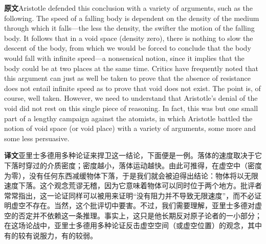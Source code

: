 \documentclass[UTF8,zihao=-4]{ctexart}
\newcommand{\BodyFont}{\fontsize{10.5pt}{15.5pt}\selectfont}
\newcommand{\origlabel}{\textbf{原文}\quad}
\newcommand{\translabel}{\textbf{译文}\quad}
\newcommand{\orig}{\par\noindent\begingroup\BodyFont\origlabel}
\newcommand{\zhline}[1]{\par\endgroup\noindent\begingroup\BodyFont\translabel #1\par\endgroup\vspace{0.35em}}
\begin{document}
\orig Aristotle defended this conclusion with a variety of arguments, such as the following. The speed of a falling body is dependent on the density of the medium through which it falls---the less the density, the swifter the motion of the falling body. It follows that in a void space (density zero), there is nothing to slow the descent of the body, from which we would be forced to conclude that the body would fall with infinite speed---a nonsensical notion, since it implies that the body could be at two places at the same time. Critics have frequently noted that this argument can just as well be taken to prove that the absence of resistance does not entail infinite speed as to prove that void does not exist. The point is, of course, well taken. However, we need to understand that Aristotle's denial of the void did not rest on this single piece of reasoning. In fact, this was but one small part of a lengthy campaign against the atomists, in which Aristotle battled the notion of void space (or void place) with a variety of arguments, some more and some less persuasive.

\zhline{亚里士多德用多种论证来捍卫这一结论，下面便是一例。落体的速度取决于它下落时穿过的介质密度；密度越小，落体运动越快。由此可推得，在虚空中（密度为零），没有任何东西减缓物体下落，于是我们就会被迫得出结论：物体将以无限速度下落。这个观念荒谬无稽，因为它意味着物体可以同时位于两个地方。批评者常常指出，这一论证同样可以被用来证明“没有阻力并不导致无限速度”，而不必证明虚空不存在。当然，这个批评切中要害。不过，我们需要理解，亚里士多德对虚空的否定并不依赖这一条推理。事实上，这只是他长期反对原子论者的一小部分；在这场论战中，亚里士多德用多种论证反击虚空空间（或虚空位置）的观念，其中有的较有说服力，有的较弱。}
\end{document}
